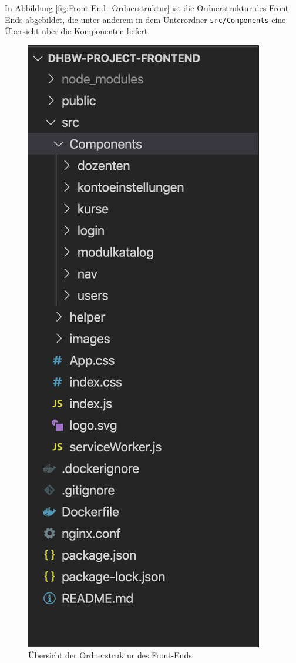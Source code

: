 In Abbildung \vref{fig:Front-End_Ordnerstruktur} ist die Ordnerstruktur des Front-Ends abgebildet, die unter anderem in dem Unterordner \texttt{src/Components} eine Übersicht über die Komponenten liefert.
\begin{figure}[H]
	\centering 
	\includegraphics[scale=0.6]{img/FrontEnd/front-end-ordnerstruktur}
	\caption[Übersicht der Ordnerstruktur des Front-Ends]{\label{fig:Front-End_Ordnerstruktur}Übersicht der Ordnerstruktur des Front-Ends\footnotemark}
\end{figure}

